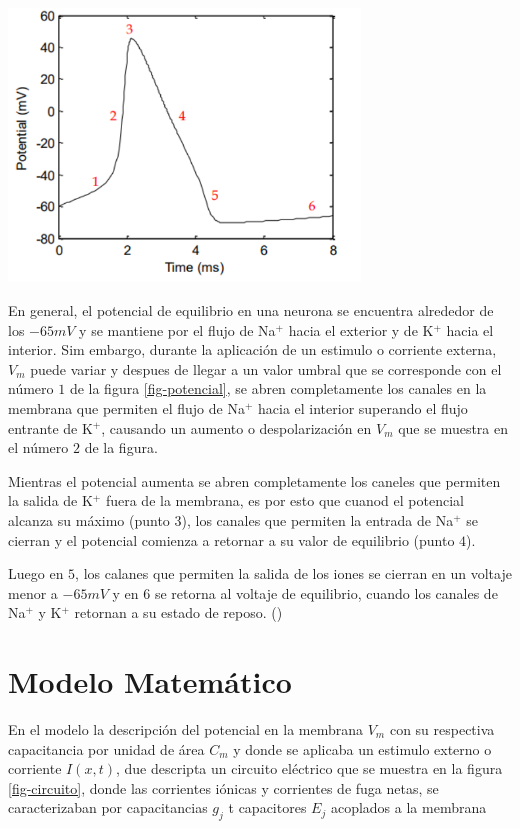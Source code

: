 \documentclass[aps,prl,reprint,groupedaddress]{revtex4-2}
\newenvironment{Figura}
  {\par\medskip\noindent\minipage{\linewidth}}
  {\endminipage\par\medskip}
\begin{document}
\begin{Figura}
    \centering
    \includegraphics[width=0.7\textwidth]{figs/potencial_accion.png}
    \label{fig-potencial}
\end{Figura}

En general, el potencial de equilibrio en una neurona se encuentra alrededor de 
los $-65 mV$ y se mantiene por el flujo de Na$^{+}$ hacia el exterior y de K$^{+}$ 
hacia el interior. Sim embargo, durante la aplicación de un estimulo o corriente 
externa, $V_{m}$ puede variar y despues de llegar a un valor umbral que se 
corresponde con el número $1$ de la figura \ref{fig-potencial}, se abren 
completamente los canales en la membrana que permiten el flujo de Na$^{+}$ hacia
el interior superando el flujo entrante de K$^{+}$, causando un aumento o 
despolarización en $V_{m}$ que se muestra en el número $2$ de la figura. 

Mientras el potencial aumenta se abren completamente los caneles que permiten 
la salida de K$^{+}$ fuera de la membrana, es por esto que cuanod el potencial
alcanza su máximo (punto 3), los canales que permiten la entrada de Na$^{+}$
se cierran y el potencial comienza a retornar a su valor de equilibrio (punto $4$).

Luego en $5$, los calanes que permiten la salida de los iones se cierran en un 
voltaje menor a $-65 mV$ y en $6$ se retorna al voltaje de equilibrio, cuando 
los canales de Na$^{+}$ y K$^{+}$ retornan a su estado de reposo. 
(\cite{lamberti2007desarrollo})

\section{Modelo Matemático}

En el modelo la descripción del potencial en la membrana $V_{m}$ con su 
respectiva capacitancia por unidad de área $C_{m}$ y donde se aplicaba un estimulo 
externo o corriente $I(x,t)$, due descripta un circuito eléctrico que se muestra
en la figura \ref{fig-circuito}, donde las corrientes iónicas y corrientes de 
fuga netas, se caracterizaban por capacitancias $g_{j}$ t capacitores $E_{j}$
acoplados a la membrana
\end{document}
